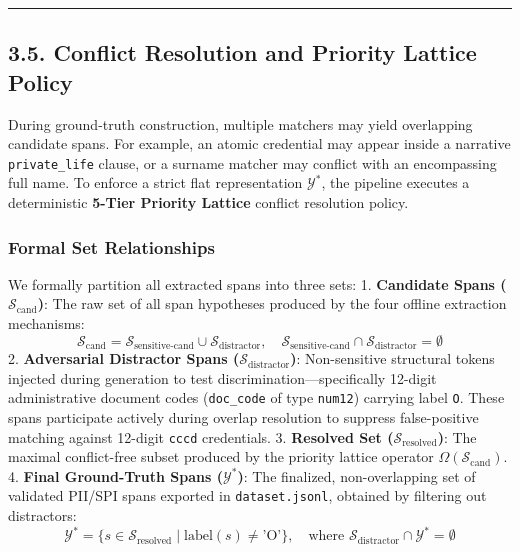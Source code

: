 \documentclass[
]{article}
\begin{document}
\begin{center}\rule{0.5\linewidth}{0.5pt}\end{center}

\subsection{3.5. Conflict Resolution and Priority Lattice
Policy}\label{conflict-resolution-and-priority-lattice-policy}

During ground-truth construction, multiple matchers may yield
overlapping candidate spans. For example, an atomic credential may
appear inside a narrative \texttt{private\_life} clause, or a surname
matcher may conflict with an encompassing full name. To enforce a strict
flat representation \(\mathcal{Y}^*\), the pipeline executes a
deterministic \textbf{5-Tier Priority Lattice} conflict resolution
policy.

\subsubsection{Formal Set Relationships}\label{formal-set-relationships}

We formally partition all extracted spans into three sets: 1.
\textbf{Candidate Spans (\(\mathcal{S}_{\text{cand}}\))}: The raw set of
all span hypotheses produced by the four offline extraction mechanisms:
\[\mathcal{S}_{\text{cand}} = \mathcal{S}_{\text{sensitive-cand}} \cup \mathcal{S}_{\text{distractor}}, \quad \mathcal{S}_{\text{sensitive-cand}} \cap \mathcal{S}_{\text{distractor}} = \emptyset\]
2. \textbf{Adversarial Distractor Spans
(\(\mathcal{S}_{\text{distractor}}\))}: Non-sensitive structural tokens
injected during generation to test discrimination---specifically
12-digit administrative document codes (\texttt{doc\_code} of type
\texttt{num12}) carrying label \texttt{O}. These spans participate
actively during overlap resolution to suppress false-positive matching
against 12-digit \texttt{cccd} credentials. 3. \textbf{Resolved Set
(\(\mathcal{S}_{\text{resolved}}\))}: The maximal conflict-free subset
produced by the priority lattice operator
\(\Omega(\mathcal{S}_{\text{cand}})\). 4. \textbf{Final Ground-Truth
Spans (\(\mathcal{Y}^*\))}: The finalized, non-overlapping set of
validated PII/SPI spans exported in \texttt{dataset.jsonl}, obtained by
filtering out distractors:
\[\mathcal{Y}^* = \{s \in \mathcal{S}_{\text{resolved}} \mid \text{label}(s) \neq \text{'O'}\}, \quad \text{where } \mathcal{S}_{\text{distractor}} \cap \mathcal{Y}^* = \emptyset\]
\end{document}
